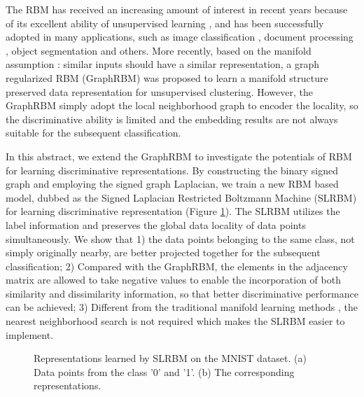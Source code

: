\documentclass[a4paper,10pt,twocolumn]{article}
\begin{document}
The RBM has received an increasing amount of interest in recent years because of its excellent ability of unsupervised learning \cite{dongdong2018graph}, and has been successfully adopted in many applications, such as image classification \cite{hinton2006reducing}, document processing \cite{hinton2009replicated}, object segmentation \cite{chen2013deep} and others. More recently, based on the manifold assumption \cite{roweis2000nonlinear,chen2014local}: similar inputs should have a similar representation, a graph regularized RBM (GraphRBM) \cite{dongdong2018graph} was proposed to learn a manifold structure preserved data representation for unsupervised clustering. However, the GraphRBM simply adopt the local neighborhood graph to encoder the locality, so the discriminative ability is limited and the embedding results are not always suitable for the subsequent classification.

In this abstract, we extend the GraphRBM to investigate the potentials of RBM for learning  discriminative representations. By constructing the binary signed graph and employing the signed graph Laplacian, we train a new RBM based model, dubbed as the Signed Laplacian Restricted Boltzmann Machine (SLRBM) for learning discriminative representation (Figure \ref{fig:1}). The SLRBM utilizes the label information and preserves the global data locality of data points simultaneously.
We show that 1) the data points belonging to the same class, not simply originally nearby, are better projected together for the subsequent classification;
2) Compared with the GraphRBM, the elements in the adjacency matrix are allowed to take negative values to enable the incorporation of both similarity and dissimilarity information, so that better discriminative performance can be achieved; 3)
Different from the traditional manifold learning methods \cite{roweis2000nonlinear,chen2017unsupervised,chen2017angle}, the nearest neighborhood search is not required which makes the SLRBM easier to implement.

\begin{figure}[t]
\begin{center}
    \hspace{2ex}
\end{center}
\caption{Representations learned by SLRBM on the MNIST dataset. (a) Data points from the class '0' and '1'. (b) The corresponding representations.}
\label{fig:1}
\end{figure}
\end{document}
